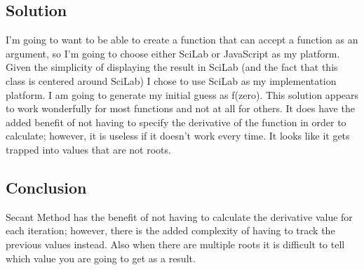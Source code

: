 \subsection{Solution}
I'm going to want to be able to create a function that can accept a function as an argument, so I'm going to choose either SciLab or JavaScript as my platform. Given the simplicity of displaying the result in SciLab (and the fact that this class is centered around SciLab) I chose to use SciLab as my implementation platform. I am going to generate my initial guess as f(zero).
This solution appears to work wonderfully for most functions and not at all for others. It does have the added benefit of not having to specify the derivative of the function in order to calculate; however, it is useless if it doesn't work every time. It looks like it gets trapped into values that are not roots.
\subsection{Conclusion}
Secant Method has the benefit of not having to calculate the derivative value for each iteration; however, there is the added complexity of having to track the previous values instead. Also when there are multiple roots it is difficult to tell which value you are going to get as a result.